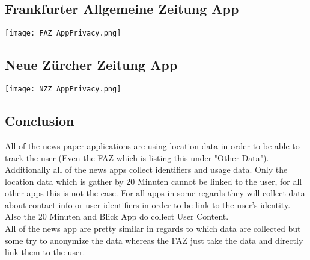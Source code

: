 \documentclass{report}
\begin{document}
		\subsection{Frankfurter Allgemeine Zeitung App \cite{FAZAppStore}}
		\startsubsection
			\texttt{[image: FAZ\_AppPrivacy.png]}
		\closesection
		\subsection{Neue Zürcher Zeitung App \cite{NZZAppStore}}
		\startsubsection
			\texttt{[image: NZZ\_AppPrivacy.png]}
		\closesection
		\subsection{Conclusion}
		\startsubsection
			All of the news paper applications are using location data in order to be able to track the user (Even the FAZ which is listing this under "Other Data"). Additionally all of the news apps collect identifiers and usage data. Only the location  data which is gather by 20 Minuten cannot be linked to the user, for all other apps this is not the case. For all apps in some regards they will collect data about contact info or user identifiers in order to be link to the user's identity. Also the 20 Minuten and Blick App do collect User Content. \\
			All of the news app are pretty similar in regards to which data are collected but some try to anonymize the data whereas the FAZ just take the data and directly link them to the user.
		\closesection
	\closesection
	
	\newpage
	{\let\clearpage\relax }
\end{document}

